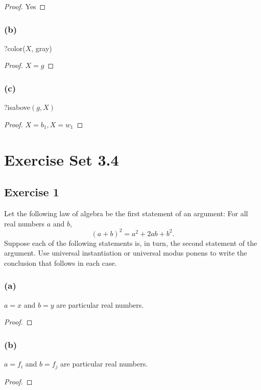 \documentclass[14pt]{extarticle}
\begin{document}
\begin{proof}
Yes
\end{proof}

\subsubsection{(b)}
?color($X$, gray)

\begin{proof}
$X = g$
\end{proof}

\subsubsection{(c)}
?isabove$(g, X)$

\begin{proof}
$X = b_1, X = w_1$
\end{proof}

\section{Exercise Set 3.4}

\subsection{Exercise 1}
Let the following law of algebra be the first statement of an argument: For all real numbers $a$ and $b$, 
$$
(a + b)^2 = a^2 + 2ab + b^2. 
$$
Suppose each of the following statements is, in turn, the second statement of the argument. Use universal instantiation or universal modus ponens to write the conclusion that follows in each case.

\subsubsection{(a)}
$a = x$ and $b = y$ are particular real numbers.

\begin{proof}

\end{proof}

\subsubsection{(b)}
$a = f_i$ and $b = f_j$ are particular real numbers.

\begin{proof}

\end{proof}
\end{document}
